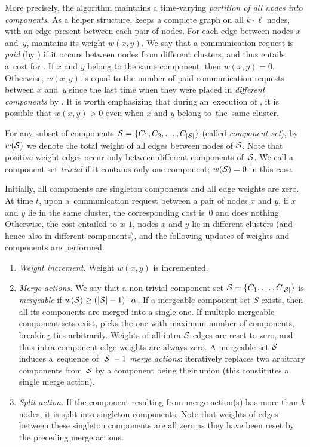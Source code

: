 More precisely, the algorithm maintains a time-varying \emph{partition of all
nodes into components}. As a helper structure, \CREP keeps a complete graph on
all $k \cdot \ell$ nodes, with an edge present between each pair of nodes. For
each edge between nodes $x$ and~$y$, \CREP maintains its weight $w(x,y)$. We
say that a communication request is \emph{paid} (by \CREP) if it occurs
between nodes from different clusters, and thus entails a~cost for \CREP. If
$x$ and $y$ belong to the same component, then $w(x,y) = 0$. Otherwise,
$w(x,y)$ is equal to the number of paid communication requests between $x$
and~$y$ since the last time when they were placed in \emph{different components} 
by \CREP. It is worth emphasizing that during an~execution of \CREP, it is
possible that $w(x,y) > 0$ even when $x$ and $y$ belong to~the~same cluster.

For any subset of components $\mathcal{S} = \{ C_1, C_2, \ldots, C_{|\mathcal{S}|} \}$ (called
\emph{component-set}), by~$w(\mathcal{S})$ we denote the total weight of all edges
between nodes of $\mathcal{S}$. Note that positive weight edges occur only between
different components of~$\mathcal{S}$. We call a component-set \emph{trivial} if it
contains only one component; $w(\mathcal{S}) = 0$ in this case.

Initially, all components are singleton components and all edge weights are
zero. At time $t$, upon a~communication request between a pair of nodes $x$
and $y$, if $x$ and $y$ lie in the same cluster, the corresponding cost is~$0$
and \CREP does nothing. Otherwise, the cost entailed to \CREP is $1$, nodes
$x$ and $y$ lie in different clusters (and hence also in different
components), and the following updates of weights and components are
performed.

\begin{enumerate}

\item \emph{Weight increment.} Weight $w(x,y)$ is incremented.

\item \emph{Merge actions.} We say that a non-trivial component-set $\mathcal{S} = \{
C_1, \ldots, C_{|\mathcal{S}|} \}$ is \emph{mergeable} if $w(\mathcal{S}) \geq
(|\mathcal{S}|-1) \cdot \alpha$. If a mergeable component-set $S$ exists, then all its
components are merged into a single one. If multiple mergeable component-sets
exist, \CREP picks the one with maximum number of components, breaking ties
arbitrarily. Weights of all intra-$\mathcal{S}$ edges are reset to zero, and thus
intra-component edge weights are always zero. A mergeable set $\mathcal{S}$ induces
a~sequence of $|\mathcal{S}|-1$ \emph{merge actions}:
\CREP iteratively replaces two arbitrary components 
from~$\mathcal{S}$ by a component being their union (this constitutes a single merge
action).

\item \emph{Split action.} If the component resulting from merge action(s)
has more than $k$ nodes, it is split into singleton
components. Note that weights of edges between these singleton components are
all zero as they have been reset by the preceding merge actions.

\end{enumerate}


